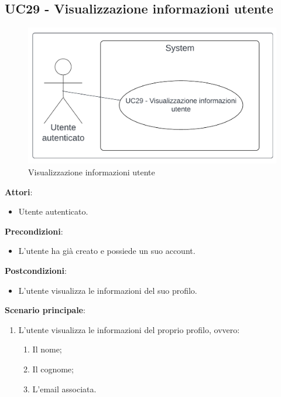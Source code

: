 \subsection{UC29 - Visualizzazione informazioni utente}\label{usecase:29}
\begin{figure}[H]
    \centering
    \includegraphics[width=0.9\linewidth]{ucd/UCD29.png}
    \caption{Visualizzazione informazioni utente}
\end{figure}
\textbf{Attori}:
\begin{itemize}
    \item Utente autenticato.
\end{itemize}
\textbf{Precondizioni}:
\begin{itemize}
    \item L'utente ha già creato e possiede un suo account.
\end{itemize}
\textbf{Postcondizioni}:
\begin{itemize}
    \item L'utente visualizza le informazioni del suo profilo.
\end{itemize}
\textbf{Scenario principale}:
\begin{enumerate}
    \item L'utente visualizza le informazioni del proprio profilo, ovvero:
    \begin{enumerate}
        \item Il nome;
        \item Il cognome;
        \item L'email associata.
    \end{enumerate}
\end{enumerate}